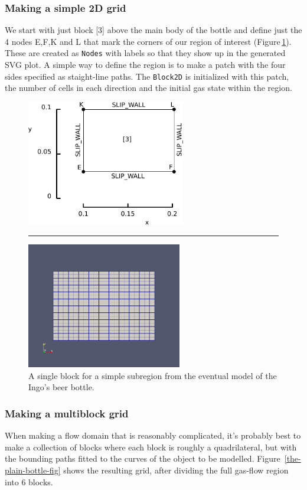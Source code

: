 \subsubsection*{Making a simple 2D grid}
%
We start with just block [3] above the main body of the bottle
and define just the 4 nodes E,F,K and L that mark the corners of our
region of interest (Figure\,\ref{the-minimal-grid-fig}).
These are created as \texttt{Nodes} with labels so that they show up in
the generated SVG plot.
A simple way to define the region is to make a patch with the four sides
specified as staight-line paths.
The \texttt{Block2D} is initialized with this patch, the number of cells
in each direction and the initial gas state within the region.

\noindent
\topbar

\bottombar

\begin{figure}[htbp]
\begin{center}
\includegraphics[height=5.5cm]{../2D/beer-bottle/the_minimal_grid_edited.pdf}
\rule{0.5cm}{0cm}
\includegraphics[height=5.5cm]{../2D/beer-bottle/the_minimal_grid.png}
\end{center}
\caption{A single block for a simple subregion from the eventual model 
         of the Ingo's beer bottle.}
\label{the-minimal-grid-fig}
\end{figure}

\subsubsection*{Making a multiblock grid}
%
When making a flow domain that is reasonably complicated, it's probably best
to make a collection of blocks where each block is roughly a quadrilateral,
but with the bounding paths fitted to the curves of the object to be modelled.
Figure~\ref{the-plain-bottle-fig} shows the resulting grid, after dividing 
the full gas-flow region into 6 blocks.

